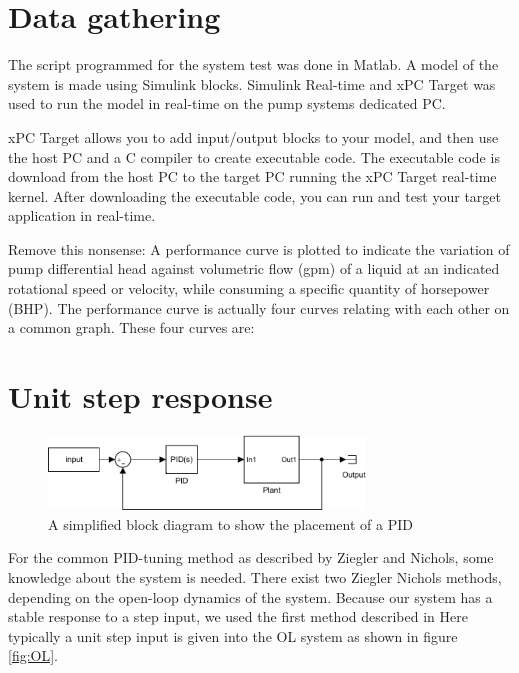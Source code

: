 
\section{Data gathering}\label{sec:data_gathering}
The script programmed for the system test was done in Matlab. 
A model of the system is made using Simulink blocks. 
Simulink Real-time and xPC Target was used to run the model in real-time on 
the pump systems dedicated PC. 




xPC Target allows you to add input/output blocks to your model, and then use the host 
PC and a C compiler to create executable code. The executable code is download 
from the host PC to the target PC running the xPC Target real-time kernel. 
After downloading the executable code, you can run and test your target 
application in real-time. 


Remove this nonsense:
A performance curve is plotted to indicate the variation of pump differential head against volumetric flow (gpm) of a liquid at an indicated rotational speed or velocity, while consuming a specific quantity of horsepower (BHP). The performance curve is actually four curves relating with each other on a common graph. These four curves are:

\section{Unit step response}
\begin{figure}[H]
    \centering
    \includegraphics[width=0.75\textwidth]{figures/04ExperimentsAndLabWork/CLblock.pdf}
    \caption{A simplified block diagram to show the placement of a PID}
	\label{fig:PIDplace}
\end{figure}

For the common PID-tuning method as described by Ziegler and Nichols,
some knowledge about the system is needed.
There exist two Ziegler Nichols methods,
depending on the open-loop dynamics of the system.
Because our system has a stable response to a step input, we used the first method described in 
Here typically a unit step input is given into the OL system as shown in figure \ref{fig:OL}.

